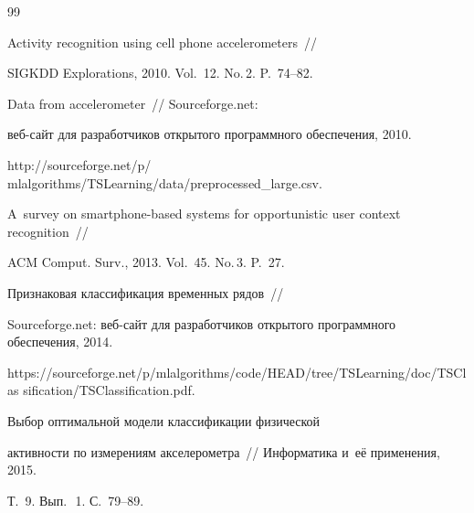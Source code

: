 {\small\frenchspacing

{%


\begin{thebibliography}{99}





    Activity recognition using cell phone accelerometers~/\!\!/ 

    SIGKDD Explorations, 2010. Vol.~12. No.\,2. P.~74--82.


  Data from accelerometer~/\!\!/ Sourceforge.net: 

веб-сайт для разработчиков открытого программного обеспечения, 2010. 

{\sf http://sourceforge.net/p/ mlalgorithms/TSLearning/data/preprocessed\_large.csv}.



A~survey on smartphone-based systems for opportunistic user context recognition~/\!\!/ 

ACM Comput. Surv., 2013. Vol.~45. No.\,3. P.~27.




 Признаковая классификация временных рядов~/\!\!/ 

Sourceforge.net: веб-сайт для разработчиков открытого программного обеспечения, 2014.

{\sf https://sourceforge.net/p/mlalgorithms/code/HEAD/tree/TSLearning/doc/TSClas sification/TSClassification.pdf}.


 Выбор оптимальной модели классификации физической 

активности по измерениям акселерометра~/\!\!/ Информатика и~её применения, 2015. 

Т.~9. Вып.\,~1. С.~79--89.



\end{thebibliography}}}
